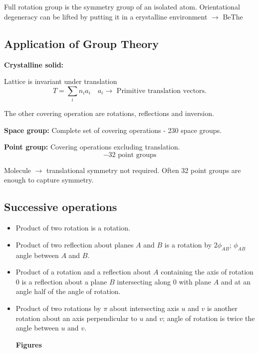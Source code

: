 \chapter{}\label{lec10}

Full rotation group is the symmetry group of an isolated atom. Orientational degeneracy can be lifted by putting it in a erystalline environment $\to$ BeThe

\section*{Application of Group Theory}

\noindent
{\bf Crystalline solid:}

Lattice is invariant under translation
$$
T=\sum\limits_{i}n_{i}a_{i}\quad a_{i}\to \text{ Primitive translation vectors.}
$$

The other covering operation are rotations, reflections and inversion.

\noindent
{\bf Space group:} Complete set of covering operations - 230 space groups.

\noindent
{\bf Point group:} Covering operations excluding translation.
$$
-32\text{ point groups}
$$

Molecule $\to$ translational symmetry not required. Often 32 point groups are enough to capture symmetry.

\section*{Successive operations}
\begin{itemize}
\item Product of two rotation is a rotation.

\item Product of two reflection about planes $A$ and $B$ is a rotation by $2\phi_{AB}$; $\phi_{AB}$ angle between $A$ and $B$.

\item Product of a rotation and a reflection about $A$ containing the axis of rotation $0$ is a reflection about a plane $B$ intersecting along $0$ with plane $A$ and at an angle half of the angle of rotation.

\item Product of two rotations by $\pi$ about intersecting axis $u$ and $v$ is another rotation about an axis perpendicular to $u$ and $v$; angle of rotation is twice the angle between $u$ and $v$.
\begin{center}
{\bf Figures}
\end{center}
\end{itemize}

